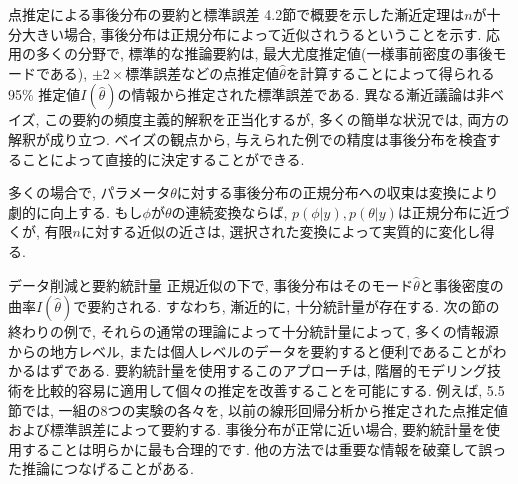 \documentclass[10pt,dvipdfmx,a4]{beamer}
\begin{document}

\begin{frame}{点推定による事後分布の要約と標準誤差}
4.2節で概要を示した漸近定理は$n$が十分大きい場合, 事後分布は正規分布によって近似されうるということを示す.
応用の多くの分野で, 標準的な推論要約は, 最大尤度推定値(一様事前密度の事後モードである), $\pm 2\times$標準誤差などの点推定値$\hat{\theta}$を計算することによって得られる95\% 推定値$I(\hat{\theta})$の情報から推定された標準誤差である.
異なる漸近議論は非ベイズ, この要約の頻度主義的解釈を正当化するが, 多くの簡単な状況では, 両方の解釈が成り立つ.
ベイズの観点から, 与えられた例での精度は事後分布を検査することによって直接的に決定することができる.

多くの場合で, パラメータ$\theta$に対する事後分布の正規分布への収束は変換により劇的に向上する.
もし$\phi$が$\theta$の連続変換ならば, $p(\phi|y), p(\theta|y)$は正規分布に近づくが, 有限$n$に対する近似の近さは, 選択された変換によって実質的に変化し得る.
\end{frame}


\begin{frame}{データ削減と要約統計量}
正規近似の下で, 事後分布はそのモード$\hat{\theta}$と事後密度の曲率$I(\hat{\theta})$で要約される.
すなわち, 漸近的に, 十分統計量が存在する.
次の節の終わりの例で, それらの通常の理論によって十分統計量によって, 多くの情報源からの地方レベル, または個人レベルのデータを要約すると便利であることがわかるはずである.
要約統計量を使用するこのアプローチは, 階層的モデリング技術を比較的容易に適用して個々の推定を改善することを可能にする.
例えば, 5.5節では, 一組の8つの実験の各々を, 以前の線形回帰分析から推定された点推定値および標準誤差によって要約する.
事後分布が正常に近い場合, 要約統計量を使用することは明らかに最も合理的です.
他の方法では重要な情報を破棄して誤った推論につなげることがある.
\end{frame}

\end{document}
